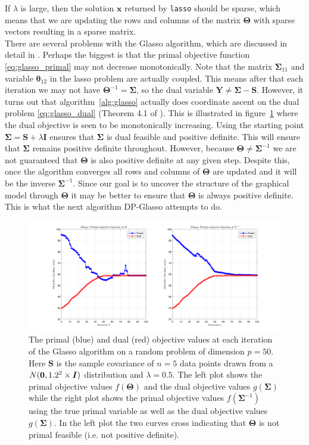 \documentclass[10pt, letterpaper]{article}
\newcommand{\bx}{\boldsymbol x} %
\newcommand{\cov}{\boldsymbol \Sigma}
\newcommand{\preci}{\boldsymbol \Theta}
\newcommand{\spreci}{\boldsymbol \theta} %
\newcommand{\sampcov}{\boldsymbol S} %
\newcommand{\dualvar}{\boldsymbol Y} %
\newcommand{\eye}{\boldsymbol I} %
\newcommand{\bzero}{{\bf 0}}
\begin{document}
If $\lambda$ is large, then the solution $\bx$ returned by \texttt{lasso} should be sparse, which means that we are updating the rows and columns of the matrix $\preci$ with sparse vectors resulting in a sparse matrix.\\

There are several problems with the Glasso algorithm, which are discussed in detail in \cite{MH}.  Perhaps the biggest is that the primal objective function \ref{eq:glasso_primal} may not decrease monotonically.  Note that the matrix $\cov_{11}$ and variable $\spreci_{12}$ in the lasso problem are actually coupled.  This means after that each iteration we may not have $\preci^{-1} = \cov$, so the dual variable $\dualvar \neq \cov - \sampcov$.  However, it turns out that algorithm~\ref{alg:glasso} actually does coordinate ascent on the dual problem \ref{eq:glasso_dual} (Theorem 4.1 of \cite{MH}).  This is illustrated in figure~\ref{fig:glasso_primaldual} where the dual objective is seen to be monotonically increasing.  Using the starting point $\cov = \sampcov + \lambda \eye$ ensures that $\cov$ is dual feasible and positive definite.  This will ensure that $\cov$ remains positive definite throughout.  However, because $\preci \neq \cov^{-1}$ we are not guaranteed that $\preci$ is also positive definite at any given step.  Despite this, once the algorithm converges all rows and columns of $\preci$ are updated and it will be the inverse $\cov^{-1}$.  Since our goal is to uncover the structure of the graphical model through $\preci$ it may be better to ensure that $\preci$ is always positive definite.  This is what the next algorithm DP-Glasso attempts to do.


\begin{figure}
\centering
\includegraphics[width=\textwidth]{plots/glasso_primaldual.png}
\caption{The primal (blue) and dual (red) objective values at each iteration of the Glasso algorithm on a random problem of dimension $p=50$.  Here $\sampcov$ is the sample covariance of $n=5$ data points drawn from a $N(\bzero, 1.2^2\times \eye)$ distribution and $\lambda = 0.5$.  The left plot shows the primal objective values $f(\preci)$ and the dual objective values $g(\cov)$ while the right plot shows the primal objective values $f(\cov^{-1})$ using the true primal variable as well as the dual objective values $g(\cov)$.  In the left plot the two curves cross indicating that $\preci$ is not primal feasible (i.e. not positive definite).}
\label{fig:glasso_primaldual}
\end{figure} 
\end{document}
